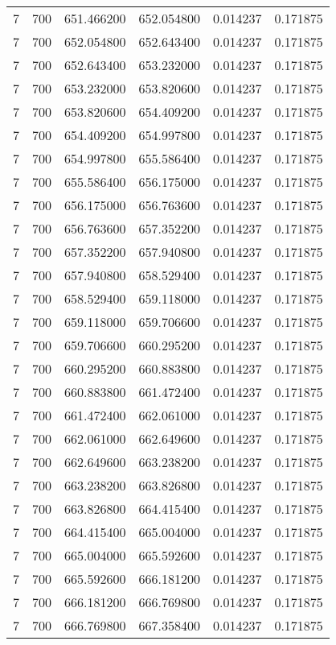 \begin{longtable}{rrrrrr}
7 & 700 & 651.466200 & 652.054800 & 0.014237 & 0.171875 \\
7 & 700 & 652.054800 & 652.643400 & 0.014237 & 0.171875 \\
7 & 700 & 652.643400 & 653.232000 & 0.014237 & 0.171875 \\
7 & 700 & 653.232000 & 653.820600 & 0.014237 & 0.171875 \\
7 & 700 & 653.820600 & 654.409200 & 0.014237 & 0.171875 \\
7 & 700 & 654.409200 & 654.997800 & 0.014237 & 0.171875 \\
7 & 700 & 654.997800 & 655.586400 & 0.014237 & 0.171875 \\
7 & 700 & 655.586400 & 656.175000 & 0.014237 & 0.171875 \\
7 & 700 & 656.175000 & 656.763600 & 0.014237 & 0.171875 \\
7 & 700 & 656.763600 & 657.352200 & 0.014237 & 0.171875 \\
7 & 700 & 657.352200 & 657.940800 & 0.014237 & 0.171875 \\
7 & 700 & 657.940800 & 658.529400 & 0.014237 & 0.171875 \\
7 & 700 & 658.529400 & 659.118000 & 0.014237 & 0.171875 \\
7 & 700 & 659.118000 & 659.706600 & 0.014237 & 0.171875 \\
7 & 700 & 659.706600 & 660.295200 & 0.014237 & 0.171875 \\
7 & 700 & 660.295200 & 660.883800 & 0.014237 & 0.171875 \\
7 & 700 & 660.883800 & 661.472400 & 0.014237 & 0.171875 \\
7 & 700 & 661.472400 & 662.061000 & 0.014237 & 0.171875 \\
7 & 700 & 662.061000 & 662.649600 & 0.014237 & 0.171875 \\
7 & 700 & 662.649600 & 663.238200 & 0.014237 & 0.171875 \\
7 & 700 & 663.238200 & 663.826800 & 0.014237 & 0.171875 \\
7 & 700 & 663.826800 & 664.415400 & 0.014237 & 0.171875 \\
7 & 700 & 664.415400 & 665.004000 & 0.014237 & 0.171875 \\
7 & 700 & 665.004000 & 665.592600 & 0.014237 & 0.171875 \\
7 & 700 & 665.592600 & 666.181200 & 0.014237 & 0.171875 \\
7 & 700 & 666.181200 & 666.769800 & 0.014237 & 0.171875 \\
7 & 700 & 666.769800 & 667.358400 & 0.014237 & 0.171875 \\

\end{longtable}
